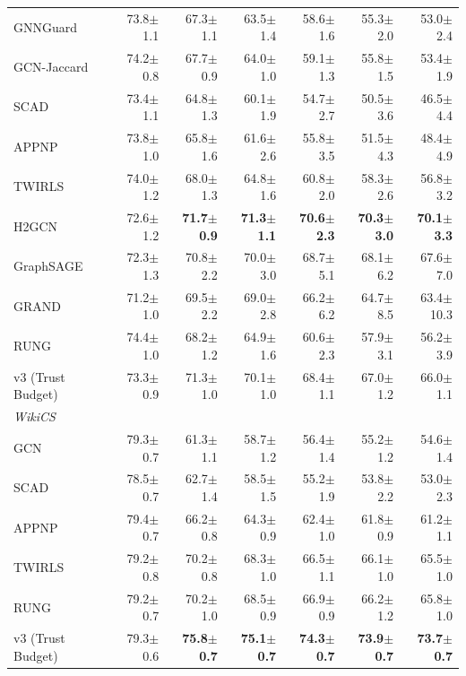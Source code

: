 \documentclass{article}
\newcommand{\score}[2]{#1{\scriptsize$\pm$#2}}
\begin{document}
\begin{center}
\begin{tabular}{lrrrrrr}
GNNGuard       & \score{73.8}{1.1} & \score{67.3}{1.1} & \score{63.5}{1.4} & \score{58.6}{1.6} & \score{55.3}{2.0} & \score{53.0}{2.4} \\
GCN-Jaccard    & \score{74.2}{0.8} & \score{67.7}{0.9} & \score{64.0}{1.0} & \score{59.1}{1.3} & \score{55.8}{1.5} & \score{53.4}{1.9} \\
SCAD           & \score{73.4}{1.1} & \score{64.8}{1.3} & \score{60.1}{1.9} & \score{54.7}{2.7} & \score{50.5}{3.6} & \score{46.5}{4.4} \\
APPNP          & \score{73.8}{1.0} & \score{65.8}{1.6} & \score{61.6}{2.6} & \score{55.8}{3.5} & \score{51.5}{4.3} & \score{48.4}{4.9} \\
TWIRLS         & \score{74.0}{1.2} & \score{68.0}{1.3} & \score{64.8}{1.6} & \score{60.8}{2.0} & \score{58.3}{2.6} & \score{56.8}{3.2} \\
H2GCN          & \score{72.6}{1.2} & \textbf{\score{71.7}{0.9}} & \textbf{\score{71.3}{1.1}} & \textbf{\score{70.6}{2.3}} & \textbf{\score{70.3}{3.0}} & \textbf{\score{70.1}{3.3}} \\
GraphSAGE      & \score{72.3}{1.3} & \score{70.8}{2.2} & \score{70.0}{3.0} & \score{68.7}{5.1} & \score{68.1}{6.2} & \score{67.6}{7.0} \\
GRAND          & \score{71.2}{1.0} & \score{69.5}{2.2} & \score{69.0}{2.8} & \score{66.2}{6.2} & \score{64.7}{8.5} & \score{63.4}{10.3} \\
RUNG           & \score{74.4}{1.0} & \score{68.2}{1.2} & \score{64.9}{1.6} & \score{60.6}{2.3} & \score{57.9}{3.1} & \score{56.2}{3.9} \\
v3 (Trust Budget) & \score{73.3}{0.9} & \score{71.3}{1.0} & \score{70.1}{1.0} & \score{68.4}{1.1} & \score{67.0}{1.2} & \score{66.0}{1.1} \\
\midrule
\multicolumn{7}{l}{\textit{WikiCS}} \\
\midrule
GCN            & \score{79.3}{0.7} & \score{61.3}{1.1} & \score{58.7}{1.2} & \score{56.4}{1.4} & \score{55.2}{1.2} & \score{54.6}{1.4} \\
SCAD           & \score{78.5}{0.7} & \score{62.7}{1.4} & \score{58.5}{1.5} & \score{55.2}{1.9} & \score{53.8}{2.2} & \score{53.0}{2.3} \\
APPNP          & \score{79.4}{0.7} & \score{66.2}{0.8} & \score{64.3}{0.9} & \score{62.4}{1.0} & \score{61.8}{0.9} & \score{61.2}{1.1} \\
TWIRLS         & \score{79.2}{0.8} & \score{70.2}{0.8} & \score{68.3}{1.0} & \score{66.5}{1.1} & \score{66.1}{1.0} & \score{65.5}{1.0} \\
RUNG           & \score{79.2}{0.7} & \score{70.2}{1.0} & \score{68.5}{0.9} & \score{66.9}{0.9} & \score{66.2}{1.2} & \score{65.8}{1.0} \\
v3 (Trust Budget) & \score{79.3}{0.6} & \textbf{\score{75.8}{0.7}} & \textbf{\score{75.1}{0.7}} & \textbf{\score{74.3}{0.7}} & \textbf{\score{73.9}{0.7}} & \textbf{\score{73.7}{0.7}} \\
\bottomrule
\end{tabular}\end{center}
\end{document}
